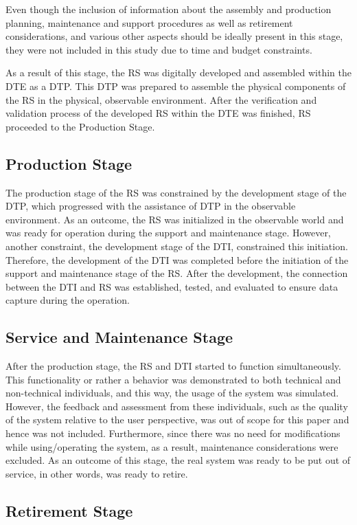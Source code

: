 \documentclass[conference]{IEEEtran}
\begin{document}
    Even though the inclusion of information about the assembly and production planning, maintenance and support procedures as well as retirement considerations,
    and various other aspects should be ideally present in this stage, they were not included in this study due to time and budget constraints. 

    As a result of this stage, the RS was digitally developed and assembled within the DTE as a DTP. This DTP was prepared to assemble the physical components of the RS in the physical,
    observable environment. After the verification and validation process of the developed RS within the DTE was finished, RS proceeded to the Production Stage.

    \subsection{Production Stage}
    The production stage of the RS was constrained by the development stage of the DTP, which progressed with the assistance of  DTP in the observable environment.  As an outcome, the RS was initialized in the observable world and was ready for operation during the support and maintenance stage. However, another constraint, the development stage of the DTI, constrained this initiation. Therefore, the development of the DTI was completed before the initiation of the support and maintenance stage of the RS. 
    After the development, the connection between the DTI and RS was established, tested, and evaluated to ensure data capture during the operation.

    \subsection{Service and Maintenance Stage}
    After the production stage, the RS and DTI started to function simultaneously. This functionality or rather a behavior was 
    demonstrated to both technical and non-technical individuals, and this way, the usage of the system was simulated. 
    However, the feedback and assessment from these individuals, such as the quality of the system relative to the user perspective, was out of 
    scope for this paper and hence was not included.  Furthermore, since there was no need for modifications while using/operating the system, 
    as a result, maintenance considerations were excluded. As an outcome of this stage, the real system was ready to be put out of service, in other words, was ready to retire.

    \subsection{Retirement Stage}
\end{document}

